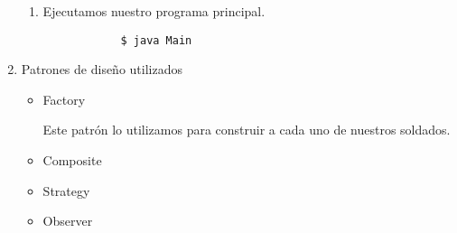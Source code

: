 \documentclass[letterpaper,11pt]{article}
\begin{document}
\begin{enumerate}
\begin{enumerate}
        \item Ejecutamos nuestro programa principal.
        \begin{verbatim}
            $ java Main 
        \end{verbatim}
    \end{enumerate}

    \item Patrones de diseño utilizados
    \begin{itemize}
        \item Factory
        
        Este patrón lo utilizamos para construir a cada uno de nuestros soldados.
        \item Composite
        \item Strategy 
        \item Observer 
    \end{itemize}
\end{enumerate}
\end{document}

